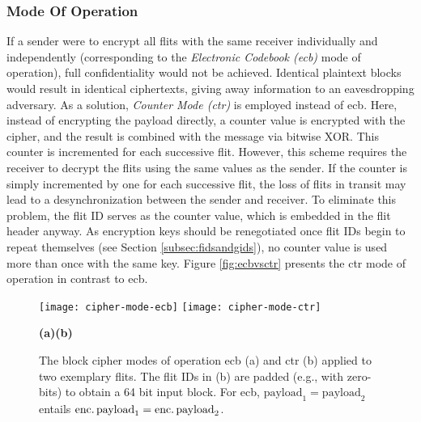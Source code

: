 \subsubsection{Mode Of Operation}
If a sender were to encrypt all flits with the same receiver individually and independently (corresponding to the \textit{Electronic Codebook
(\gls{ecb})} mode of operation), full confidentiality would not be achieved. Identical plaintext blocks would result in identical ciphertexts, giving
away information to an eavesdropping adversary. As a solution, \textit{Counter Mode (\gls{ctr})} is employed instead of \gls{ecb}. Here, instead of
encrypting the payload directly, a counter value is encrypted with the cipher, and the result is combined with the message via bitwise XOR. This counter is
incremented for each successive flit. However, this scheme requires the receiver to decrypt the flits using the same values as the sender. If the counter is simply
incremented by one for each successive flit, the loss of flits in transit may lead to a desynchronization between the sender and receiver. To
eliminate this problem, the flit ID serves as the counter value, which is embedded in the flit header anyway. As encryption keys should be
renegotiated once flit IDs begin to repeat themselves (see Section \ref{subsec:fidsandgids}), no counter value is used more than once with the same
key. Figure \vref{fig:ecbvsctr} presents the \gls{ctr} mode of operation in contrast to \gls{ecb}.

\begin{figure}
    \centering
    \texttt{[image: cipher-mode-ecb]}\hfill
    \texttt{[image: cipher-mode-ctr]}\\
    \vspace{0.5\baselineskip}
    \begin{footnotesize}
        \hspace*{0.2\textwidth}\textbf{(a)}\hfill\textbf{(b)}\hspace*{0.19\textwidth}
    \end{footnotesize}
    \caption[ECB and CTR block cipher modes of operation]{The block cipher modes of operation \gls{ecb} (a) and \gls{ctr} (b) applied to two exemplary
    flits. The flit IDs in (b) are padded (e.g., with zero-bits) to obtain a 64 bit input block. For \gls{ecb}, $\text{payload}_1 = \text{payload}_2$
    entails $\text{enc.\,payload}_1 = \text{enc.\,payload}_2$.}
    \label{fig:ecbvsctr}
\end{figure}

